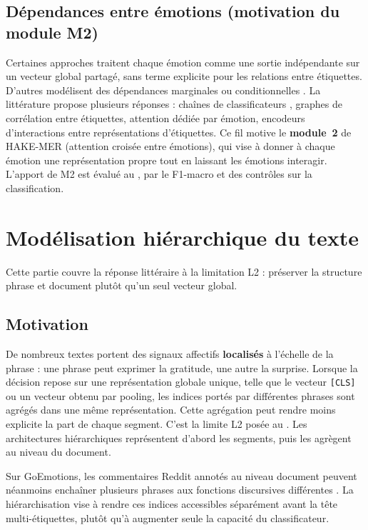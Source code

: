 \subsection{Dépendances entre émotions (motivation du module M2)}

Certaines approches traitent chaque émotion comme une sortie
indépendante sur un vecteur global partagé, sans terme explicite pour
les relations entre étiquettes. D'autres modélisent des dépendances
marginales ou conditionnelles \cite{dembczynski2012}. La littérature
propose plusieurs réponses : chaînes de classificateurs
\cite{read2009classifier,read2019classifier}, graphes de corrélation
entre étiquettes, attention dédiée par émotion, encodeurs d'interactions
entre représentations d'étiquettes. Ce fil motive le \textbf{module~2}
de HAKE-MER (attention croisée entre émotions), qui vise à donner à
chaque émotion une représentation propre tout en laissant les émotions
interagir. L'apport de M2 est évalué au , par
le F1-macro et des contrôles sur la classification.

\section{Modélisation hiérarchique du texte}
\label{sec:etat-hierarchie}

Cette partie couvre la réponse littéraire à la limitation L2 : préserver
la structure phrase et document plutôt qu'un seul vecteur global.

\subsection{Motivation}

De nombreux textes portent des signaux affectifs \textbf{localisés}
à l'échelle de la phrase : une phrase peut exprimer la gratitude,
une autre la surprise. Lorsque la décision repose sur une représentation
globale unique, telle que le vecteur \texttt{[CLS]} ou un vecteur obtenu
par pooling, les indices portés par différentes phrases sont agrégés
dans une même représentation. Cette agrégation peut rendre moins
explicite la part de chaque segment. C'est la limite L2 posée au
. Les architectures hiérarchiques représentent
d'abord les segments, puis les agrègent au niveau du document.

Sur GoEmotions, les commentaires Reddit annotés au niveau document
peuvent néanmoins enchaîner plusieurs phrases aux fonctions discursives
différentes \cite{demszky2020}. La hiérarchisation vise à rendre ces
indices accessibles séparément avant la tête multi-étiquettes, plutôt
qu'à augmenter seule la capacité du classificateur.


